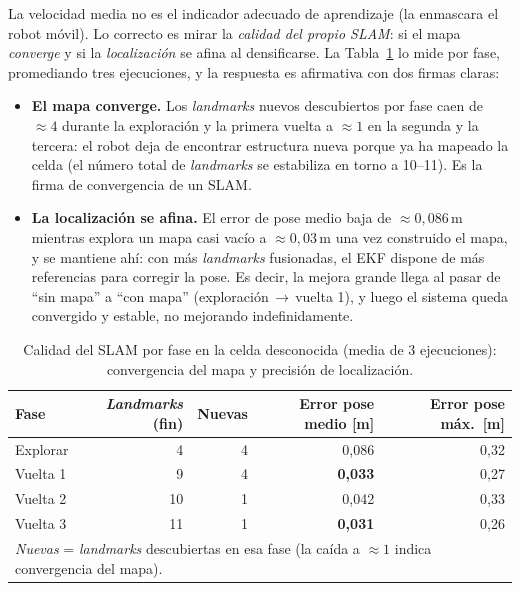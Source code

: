 La velocidad media no es el indicador adecuado de aprendizaje (la enmascara el robot
móvil). Lo correcto es mirar la \emph{calidad del propio SLAM}: si el mapa
\emph{converge} y si la \emph{localización} se afina al densificarse. La
Tabla~\ref{tab:phase2-slam} lo mide por fase, promediando tres ejecuciones, y la
respuesta es afirmativa con dos firmas claras:

\begin{itemize}
  \item \textbf{El mapa converge.} Los \textit{landmarks} nuevos descubiertos por
  fase caen de \(\approx 4\) durante la exploración y la primera vuelta a \(\approx
  1\) en la segunda y la tercera: el robot deja de encontrar estructura nueva porque
  ya ha mapeado la celda (el número total de \textit{landmarks} se estabiliza en torno
  a 10--11). Es la firma de convergencia de un SLAM.
  \item \textbf{La localización se afina.} El error de pose medio baja de \(\approx
  0{,}086\)\,m mientras explora un mapa casi vacío a \(\approx 0{,}03\)\,m una vez
  construido el mapa, y se mantiene ahí: con más \textit{landmarks} fusionadas, el EKF
  dispone de más referencias para corregir la pose. Es decir, la mejora grande llega
  al pasar de ``sin mapa'' a ``con mapa'' (exploración\,\(\to\)\,vuelta 1),
  y luego el sistema queda convergido y estable, no mejorando indefinidamente.
\end{itemize}

\begin{table}[H]
\centering
\caption{Calidad del SLAM por fase en la celda desconocida (media de 3 ejecuciones):
convergencia del mapa y precisión de localización.}\label{tab:phase2-slam}
\small
\begin{tabular}{lrrrr}
\toprule
\textbf{Fase} & \textbf{\textit{Landmarks} (fin)} & \textbf{Nuevas} & \textbf{Error pose medio [m]} & \textbf{Error pose máx.\ [m]}\\
\midrule
Explorar & 4 & 4 & 0,086 & 0,32\\
Vuelta 1 & 9 & 4 & \textbf{0,033} & 0,27\\
Vuelta 2 & 10 & 1 & 0,042 & 0,33\\
Vuelta 3 & 11 & 1 & \textbf{0,031} & 0,26\\
\bottomrule
\multicolumn{5}{l}{\footnotesize \textit{Nuevas} = \textit{landmarks} descubiertas en
esa fase (la caída a \(\approx 1\) indica convergencia del mapa).}\\
\end{tabular}
\end{table}


